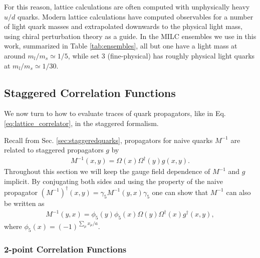 For this reason, lattice calculations are often computed with unphysically heavy $u/d$ quarks. Modern lattice calculations have computed observables for a number of light quark masses and extrapolated downwards to the physical light mass, using chiral perturbation theory as a guide. In the MILC ensembles we use in this work, summarized in Table \ref{tab:ensembles}, all but one have a light mass at around $m_l/m_s \simeq 1/5$, while set 3 (fine-physical) has roughly physical light quarks at $m_l/m_s \simeq 1/30$.


\subsection{Staggered Correlation Functions}
\label{sec:staggeredcorrelators}

We now turn to how to evaluate traces of quark propagators, like in Eq. \eqref{eq:lattice_correlator}, in the staggered formalism. %

Recall from Sec. \ref{sec:staggeredquarks}, propagators for naive quarks $M^{-1}$ are related to staggered propagators $g$ by
\begin{align}
  M^{-1}(x,y) = \Omega(x)\Omega^{\dagger}(y) g(x,y).
\end{align}
Throughout this section we will keep the gauge field dependence of $M^{-1}$ and $g$ implicit. By conjugating both sides and using the property of the naive propagator $(M^{-1})^{\dagger}(x,y) = \gamma_5 M^{-1}(y,x)\gamma_5$ one can show that $M^{-1}$ can also be written as
\begin{align}
  \label{eq:Gconj}
  M^{-1}(y,x) = \phi_5(y)\phi_5(x) \Omega(y)\Omega^{\dagger}(x) g^{\dagger}(x,y),
\end{align}
where $\phi_5(x) = (-1)^{\sum_{\mu} x_{\mu}/a}$.

\subsubsection{2-point Correlation Functions}

